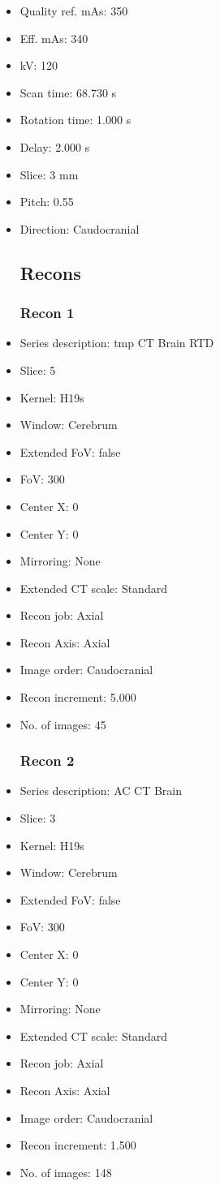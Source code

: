 \documentclass[12pt]{article}
\begin{document}
\begin{itemize}
\subsection{Scan}
\item Quality ref. mAs: 350\item Eff. mAs: 340\item kV: 120\item Scan time: 68.730 s\item Rotation time: 1.000 s\item Delay: 2.000 s\item Slice: 3 mm\item Pitch: 0.55\item Direction: Caudocranial\subsection{Recons}

\subsubsection{Recon 1}
\item Series description: tmp CT Brain RTD
\item Slice: 5
\item Kernel: H19s
\item Window: Cerebrum
\item Extended FoV: false
\item FoV: 300
\item Center X: 0
\item Center Y: 0
\item Mirroring: None
\item Extended CT scale: Standard
\item Recon job: Axial
\item Recon Axis: Axial
\item Image order: Caudocranial
\item Recon increment: 5.000
\item No. of images: 45
\subsubsection{Recon 2}
\item Series description: AC CT Brain
\item Slice: 3
\item Kernel: H19s
\item Window: Cerebrum
\item Extended FoV: false
\item FoV: 300
\item Center X: 0
\item Center Y: 0
\item Mirroring: None
\item Extended CT scale: Standard
\item Recon job: Axial
\item Recon Axis: Axial
\item Image order: Caudocranial
\item Recon increment: 1.500
\item No. of images: 148

\end{itemize}
\end{document}
